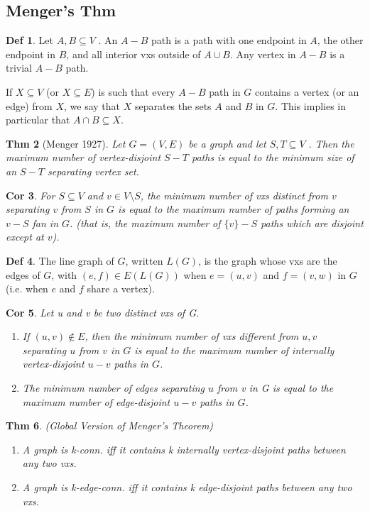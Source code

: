 \documentclass[11pt, fleqn, a4paper, landscape]{article}
\theoremstyle{plain} %
\newtheorem{thm}{Thm}
\newtheorem{cor}[thm]{Cor}
\theoremstyle{remark} %
\theoremstyle{definition} %
\newtheorem{defi}[thm]{Def}
\begin{document}
\begin{multicols}{5}
\subsection{Menger’s Thm}

\begin{defi}
Let $A,B \subseteq V$ . An $A-B$ path is a path with one endpoint in $A$, the other endpoint in $B$, and all interior vxs outside of $A \cup B$. Any vertex in $A - B$ is a trivial $A-B$ path.

If $X \subseteq V$ (or $X \subseteq E$) is such that every $A-B$ path in $G$ contains a vertex (or an edge) from $X$, we say that $X$ separates the sets $A$ and $B$ in $G$. This implies in particular that $A \cap B \subseteq X$.
\end{defi}
\begin{thm}[Menger 1927]
Let $G = (V,E)$ be a graph and let $S, T \subseteq V$ . Then the maximum
number of vertex-disjoint $S-T$ paths is equal to the minimum size of an $S-T$ separating vertex set.
\end{thm}

\begin{cor}
For $S \subseteq V$ and $v\in V \setminus S$, the minimum number of vxs distinct from $v$ separating $v$ from $S$ in $G$ is equal to the maximum number of paths forming an $v-S$ fan in $G$. (that is, the maximum number of $\{v\}-S$ paths which are disjoint except at $v$).
\end{cor}

\begin{defi}
The line graph of $G$, written $L(G)$, is the graph whose vxs are the edges of $G$, with $(e, f) \in E(L(G))$ when $e = (u, v)$ and $f = (v,w)$ in $G$ (i.e. when $e$ and $f$ share a vertex).
\end{defi}
\addtocounter{thm}{1}
\begin{cor}
Let u and v be two distinct vxs of G.
\begin{enumerate}
\item If $(u, v) \notin E$, then the minimum number of vxs different from $u, v$ separating $u$ from $v$ in $G$ is equal to the maximum number of internally vertex-disjoint $u-v$ paths in $G$.
\item The minimum number of edges separating $u$ from v in G is equal to the maximum number of edge-disjoint $u-v$ paths in $G$.
\end{enumerate}
\end{cor}

\begin{thm}
(Global Version of Menger’s Theorem)
\begin{enumerate}
\item A graph is k-conn. iff it contains k internally vertex-disjoint paths between any
two vxs.
\item A graph is k-edge-conn. iff it contains k edge-disjoint paths between any two
vxs.
\end{enumerate}
\end{thm}


\end{multicols}
\end{document}
